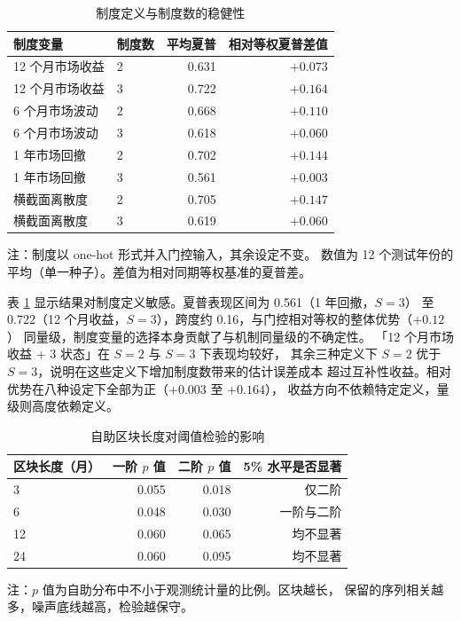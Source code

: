 \begin{table}[htbp]
\centering
\caption{制度定义与制度数的稳健性}
\label{tab:statedef}
\begin{threeparttable}
\small
\begin{tabular}{llrr}
\toprule
制度变量 & 制度数 & 平均夏普 & 相对等权夏普差值 \\
\midrule
12 个月市场收益 & 2 & 0.631 & $+0.073$ \\
12 个月市场收益 & 3 & 0.722 & $+0.164$ \\
6 个月市场波动 & 2 & 0.668 & $+0.110$ \\
6 个月市场波动 & 3 & 0.618 & $+0.060$ \\
1 年市场回撤 & 2 & 0.702 & $+0.144$ \\
1 年市场回撤 & 3 & 0.561 & $+0.003$ \\
横截面离散度 & 2 & 0.705 & $+0.147$ \\
横截面离散度 & 3 & 0.619 & $+0.060$ \\
\bottomrule
\end{tabular}
\begin{tablenotes}[flushleft]\footnotesize
\item 注：制度以 one-hot 形式并入门控输入，其余设定不变。
数值为 12 个测试年份的平均（单一种子）。差值为相对同期等权基准的夏普差。
\end{tablenotes}
\end{threeparttable}
\end{table}

表 \ref{tab:statedef} 显示结果对制度定义敏感。夏普表现区间为 0.561（1 年回撤，$S=3$）
至 0.722（12 个月收益，$S=3$），跨度约 0.16，与门控相对等权的整体优势（$+0.12$）
同量级，制度变量的选择本身贡献了与机制同量级的不确定性。
「12 个月市场收益 + 3 状态」在 $S=2$ 与 $S=3$ 下表现均较好，
其余三种定义下 $S=2$ 优于 $S=3$，说明在这些定义下增加制度数带来的估计误差成本
超过互补性收益。相对优势在八种设定下全部为正（$+0.003$ 至 $+0.164$），
收益方向不依赖特定定义，量级则高度依赖定义。

\begin{table}[htbp]
\centering
\caption{自助区块长度对阈值检验的影响}
\label{tab:block}
\begin{threeparttable}
\small
\begin{tabular}{lrrr}
\toprule
区块长度（月） & 一阶 $p$ 值 & 二阶 $p$ 值 & 5\% 水平是否显著 \\
\midrule
3 & 0.055 & 0.018 & 仅二阶 \\
6 & 0.048 & 0.030 & 一阶与二阶 \\
12 & 0.060 & 0.065 & 均不显著 \\
24 & 0.060 & 0.095 & 均不显著 \\
\bottomrule
\end{tabular}
\begin{tablenotes}[flushleft]\footnotesize
\item 注：$p$ 值为自助分布中不小于观测统计量的比例。区块越长，
保留的序列相关越多，噪声底线越高，检验越保守。
\end{tablenotes}
\end{threeparttable}
\end{table}

